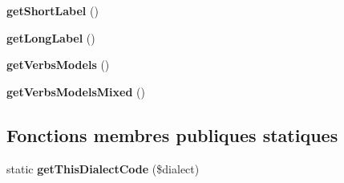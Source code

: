 \begin{DoxyCompactItemize}
\item 
\hypertarget{classConjugationManagerBase_ababdfdc7a62b48362bcdfa38aed647d5}{}\label{classConjugationManagerBase_ababdfdc7a62b48362bcdfa38aed647d5} 
{\bfseries get\+Short\+Label} ()
\item 
\hypertarget{classConjugationManagerBase_adc1333ad8b45b63d63424c2b6754e8f5}{}\label{classConjugationManagerBase_adc1333ad8b45b63d63424c2b6754e8f5} 
{\bfseries get\+Long\+Label} ()
\item 
\hypertarget{classConjugationManagerBase_ac7e4846ef7b60545bb2b4d77f6bf7f0f}{}\label{classConjugationManagerBase_ac7e4846ef7b60545bb2b4d77f6bf7f0f} 
{\bfseries get\+Verbs\+Models} ()
\item 
\hypertarget{classConjugationManagerBase_a87ceb2a9767830108d01928c19a90f83}{}\label{classConjugationManagerBase_a87ceb2a9767830108d01928c19a90f83} 
{\bfseries get\+Verbs\+Models\+Mixed} ()
\end{DoxyCompactItemize}
\subsection*{Fonctions membres publiques statiques}
\begin{DoxyCompactItemize}
\item 
\hypertarget{classConjugationManagerBase_a0249bf3a9b7eb739e074bac74c436cdc}{}\label{classConjugationManagerBase_a0249bf3a9b7eb739e074bac74c436cdc} 
static {\bfseries get\+This\+Dialect\+Code} (\$dialect)
\end{DoxyCompactItemize}
